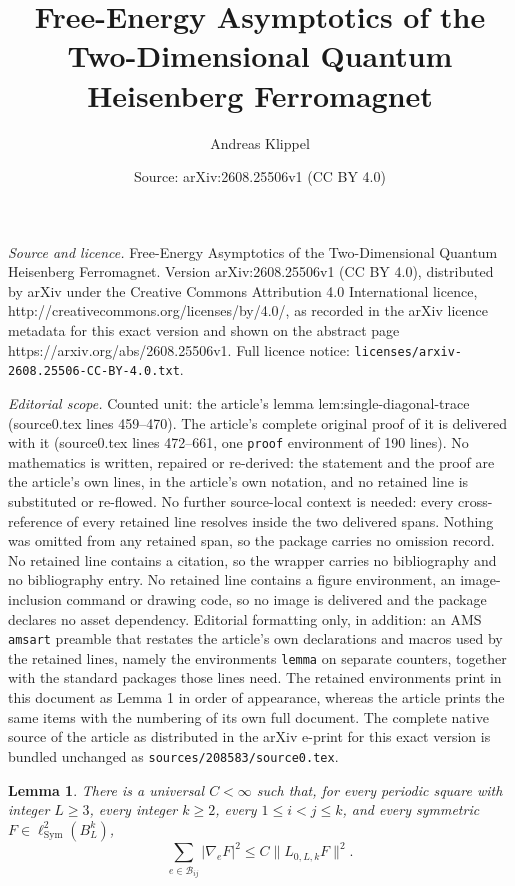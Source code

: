 \documentclass[10pt,a4paper]{amsart}
\title{Free-Energy Asymptotics of the Two-Dimensional Quantum Heisenberg Ferromagnet}
\author{Andreas Klippel}
\date{Source: arXiv:2608.25506v1 (CC BY 4.0)}
\newtheorem{lemma}{Lemma}
\newcommand{\Sym}{\operatorname{Sym}}
\begin{document}
\maketitle

\noindent\emph{Source and licence.} Free-Energy Asymptotics of the Two-Dimensional Quantum Heisenberg Ferromagnet. Version arXiv:2608.25506v1 (CC BY 4.0), distributed by arXiv under the Creative Commons Attribution 4.0 International licence, http://creativecommons.org/licenses/by/4.0/, as recorded in the arXiv licence metadata for this exact version and shown on the abstract page https://arxiv.org/abs/2608.25506v1. Full licence notice: \texttt{licenses/arxiv-2608.25506-CC-BY-4.0.txt}.\par\smallskip

\noindent\textit{Editorial scope.} Counted unit: the article's lemma lem:single-diagonal-trace (source0.tex lines 459--470). The article's complete original proof of it is delivered with it (source0.tex lines 472--661, one \texttt{proof} environment of 190 lines). No mathematics is written, repaired or re-derived: the statement and the proof are the article's own lines, in the article's own notation, and no retained line is substituted or re-flowed.  No further source-local context is needed: every cross-reference of every retained line resolves inside the two delivered spans.  Nothing was omitted from any retained span, so the package carries no omission record.  No retained line contains a citation, so the wrapper carries no bibliography and no bibliography entry.  No retained line contains a figure environment, an image-inclusion command or drawing code, so no image is delivered and the package declares no asset dependency.  Editorial formatting only, in addition: an AMS \texttt{amsart} preamble that restates the article's own declarations and macros used by the retained lines, namely the environments \texttt{lemma} on separate counters, together with the standard packages those lines need.  The retained environments print in this document as Lemma 1 in order of appearance, whereas the article prints the same items with the numbering of its own full document.  The complete native source of the article as distributed in the arXiv e-print for this exact version is bundled unchanged as \texttt{sources/208583/source0.tex}.
\begin{lemma}
\label{lem:single-diagonal-trace}
There is a universal \(C<\infty\) such that, for every periodic square with
integer \(L\geq3\), every integer \(k\geq2\), every
\(1\leq i<j\leq k\), and every symmetric
\(F\in\ell^2_{\Sym}(B_L^k)\),
\begin{equation}
 \sum_{e\in\mathcal B_{ij}}|\nabla_eF|^2
 \leq C\|L_{0,L,k}F\|^2.
 \label{eq:single-diagonal-trace}
\end{equation}
\end{lemma}
\end{document}
